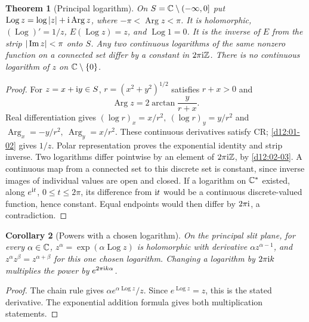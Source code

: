 \documentclass[11pt,a4paper,openany]{book}
\newtheorem{theorem}{Theorem}[chapter]
\newtheorem{corollary}[theorem]{Corollary}
\theoremstyle{definition}
\theoremstyle{remark}\newtheorem{remark}[theorem]{Remark}
\newcommand{\family}[1]{}
\begin{document}
\begin{theorem}[Principal logarithm]\family{D12.02.04}\label{d12:02-04}
On \(S=\mathbb C\setminus(-\infty,0]\) put
\(\operatorname{Log}z=\log|z|+\mathrm i\operatorname{Arg}z\), where
\(-\pi<\operatorname{Arg}z<\pi\).
It is holomorphic, \((\operatorname{Log})'=1/z\),
\(E(\operatorname{Log}z)=z\), and \(\operatorname{Log}1=0\).
It is the inverse of \(E\) from the strip \(|\operatorname{Im} z|<\pi\) onto \(S\).
Any two continuous logarithms of the same nonzero function on a connected
set differ by a constant in \(2\pi\mathrm i\mathbb Z\).
There is no continuous logarithm of \(z\) on \(\mathbb C\setminus\{0\}\).
\end{theorem}
\begin{proof}
For \(z=x+\mathrm i y\in S\), \(r=(x^2+y^2)^{1/2}\) satisfies \(r+x>0\) and
\[
 \operatorname{Arg}z=2\arctan\frac y{r+x}.
\]
Real differentiation gives
\((\log r)_x=x/r^2,\ (\log r)_y=y/r^2\) and
\(\operatorname{Arg}_x=-y/r^2,\ \operatorname{Arg}_y=x/r^2\).
These continuous derivatives satisfy CR; \cref{d12:01-02} gives \(1/z\).
Polar representation proves the exponential identity and strip inverse.
Two logarithms differ pointwise by an element of \(2\pi\mathrm i\mathbb Z\), by
\cref{d12:02-03}. A continuous map from a connected set to this discrete
set is constant, since inverse images of individual values are open and
closed. If a logarithm on \(\mathbb C^*\) existed, along \(e^{\mathrm i t}\),
\(0\le t\le2\pi\), its difference from \(\mathrm i t\) would be a continuous
discrete-valued function, hence constant. Equal endpoints would then
differ by \(2\pi\mathrm i\), a contradiction.
\end{proof}

\begin{corollary}[Powers with a chosen logarithm]\label{d12:02-04-powers}
On the principal slit plane, for every \(\alpha\in\mathbb C\),
\(z^\alpha=\exp(\alpha\operatorname{Log}z)\) is holomorphic with
derivative \(\alpha z^{\alpha-1}\), and
\(z^\alpha z^\beta=z^{\alpha+\beta}\) for this one chosen logarithm.
Changing a logarithm by \(2\pi\mathrm i k\) multiplies the power by
\(e^{2\pi\mathrm i k\alpha}\).
\end{corollary}
\begin{proof}
The chain rule gives \(\alpha e^{\alpha\operatorname{Log}z}/z\).
Since \(e^{\operatorname{Log}z}=z\), this is the stated derivative.
The exponential addition formula gives both multiplication statements.
\end{proof}
\end{document}
